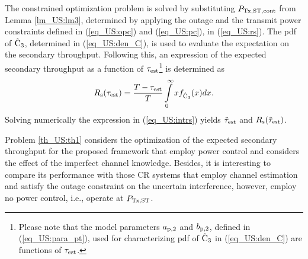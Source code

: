 \begin{IEEEproof}
The constrained optimization problem is solved by substituting $P_{\text{Tx,ST,cont}}$ from Lemma \ref{lm_US:lm3}, determined by applying the outage and the transmit power constraints defined in (\ref{eq_US:opc}) and (\ref{eq_US:pc}), in (\ref{eq_US:rs}). 
The pdf of $\hat{\text{{C}}}_{\text{3}}$, determined in (\ref{eq_US:den_C}), is used to evaluate the expectation on the secondary throughput. Following this, an expression of the expected secondary throughput as a function of $\tau_{\text{est}}$\footnote{Please note that the model parameters $a_{\text{p,2}}$ and $b_{\text{p,2}}$, defined in (\ref{eq_US:para_pt}), used for characterizing pdf of $\hat{\text{{C}}}_{\text{3}}$ in (\ref{eq_US:den_C}) are functions of $\tau_{\text{est}}$.} is determined as
\begin{equation}
R_{\text{s}}(\tau_{\text{est}}) = \frac{T - \tau_{\text{est}}}{T} \int\limits_{0}^{\infty} x f_{\hat{\text{{C}}}_{\text{3}}}(x) dx. \label{eq_US:intrs}
\end{equation}
Solving numerically the expression in (\ref{eq_US:intrs}) yields $\tilde{\tau}_{\text{est}}$ and $R_{\text{s}}(\tilde{\tau}_{\text{est}})$. 
\end{IEEEproof}
\begin{coro} \label{cor_US:cor2}
\normalfont
Problem \ref{th_US:th1} considers the optimization of the expected secondary throughput for the proposed framework that employ power control and considers the effect of the imperfect channel knowledge.  Besides, it is interesting to compare its performance with those CR systems that employ channel estimation and satisfy the outage constraint on the uncertain interference, however, employ no power control, i.e., operate at $P_{\text{Tx,ST}}$. 
\end{coro}


